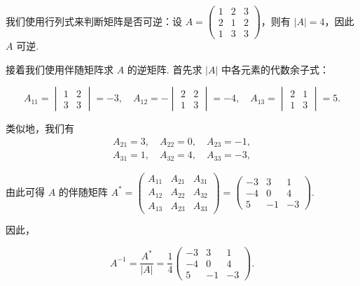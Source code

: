 \begin{solution}
    我们使用行列式来判断矩阵是否可逆：设 $A=\begin{pmatrix}
        1 & 2 & 3 \\ 2 & 1 & 2 \\ 1 & 3 & 3
    \end{pmatrix}$，则有 $|A| = 4$，因此 $A$ 可逆.

    接着我们使用伴随矩阵求 $A$ 的逆矩阵. 首先求 $|A|$ 中各元素的代数余子式：

    \[
        A_{11} = \begin{vmatrix}
            1 & 2 \\ 3 & 3
        \end{vmatrix} = -3, \quad
        A_{12} = - \begin{vmatrix}
            2 & 2 \\ 1 & 3
        \end{vmatrix} = -4, \quad
        A_{13} = \begin{vmatrix}
            2 & 1 \\ 1 & 3
        \end{vmatrix} = 5.
    \]

    类似地，我们有
    \begin{gather*}
        A_{21} = 3, \quad A_{22} = 0, \quad A_{23} = -1, \\
        A_{31} = 1, \quad A_{32} = 4, \quad A_{33} = -3,
    \end{gather*}

    由此可得 $A$ 的伴随矩阵 $A^* = \begin{pmatrix}
            A_{11} & A_{21} & A_{31} \\
            A_{12} & A_{22} & A_{32} \\
            A_{13} & A_{23} & A_{33}
        \end{pmatrix} = \begin{pmatrix}
            -3 & 3 & 1 \\
            -4 & 0 & 4 \\
            5 & -1 & -3
        \end{pmatrix}$.

    因此，

    \[
        A^{-1} = \dfrac{A^*}{|A|} = \dfrac{1}{4} \begin{pmatrix}
            -3 & 3 & 1 \\
            -4 & 0 & 4 \\
            5 & -1 & -3
            \end{pmatrix}.
    \]
\end{solution}


